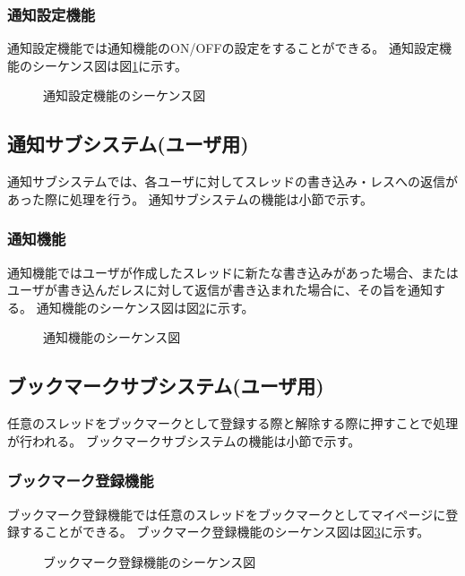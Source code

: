 \documentclass[a4j]{jarticle}
\begin{document}
  \subsubsection{通知設定機能}
  通知設定機能では通知機能のON/OFFの設定をすることができる。
  通知設定機能のシーケンス図は図\ref{fig:mypage_notice.png}に示す。
  \begin{figure}[H]
    \centering
    \caption{通知設定機能のシーケンス図}
    \label{fig:mypage_notice.png}
  \end{figure}


  \subsection{通知サブシステム(ユーザ用)}
  通知サブシステムでは、各ユーザに対してスレッドの書き込み・レスへの返信があった際に処理を行う。
  通知サブシステムの機能は小節で示す。
  \subsubsection{通知機能}
  通知機能ではユーザが作成したスレッドに新たな書き込みがあった場合、またはユーザが書き込んだレスに対して返信が書き込まれた場合に、その旨を通知する。
  通知機能のシーケンス図は図\ref{fig:bbs_notice.png}に示す。
  \begin{figure}[H]
    \centering
    \caption{通知機能のシーケンス図}
    \label{fig:bbs_notice.png}
  \end{figure}




  \subsection{ブックマークサブシステム(ユーザ用)}
  任意のスレッドをブックマークとして登録する際と解除する際に押すことで処理が行われる。
  ブックマークサブシステムの機能は小節で示す。
  \subsubsection{ブックマーク登録機能}
  ブックマーク登録機能では任意のスレッドをブックマークとしてマイページに登録することができる。
  ブックマーク登録機能のシーケンス図は図\ref{fig:bookmark_register.png}に示す。
  \begin{figure}[H]
    \centering
    \caption{ブックマーク登録機能のシーケンス図}
    \label{fig:bookmark_register.png}
  \end{figure}
\end{document}
